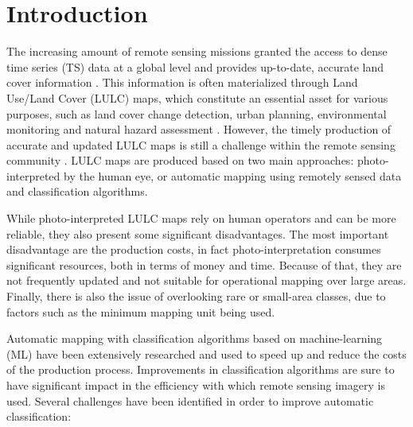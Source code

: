 \documentclass[remotesensing,article,submit,moreauthors,pdftex]{Definitions/mdpi}
\begin{document}
\section{Introduction}

The increasing amount of remote sensing missions granted the access to dense
time series (TS) data at a global level and provides up-to-date, accurate land
cover information \cite{Drusch2012}. This information is often materialized
through Land Use/Land Cover (LULC) maps, which constitute an essential asset for
various purposes, such as land cover change detection, urban planning,
environmental monitoring and natural hazard assessment \cite{Khatami2016}.
However, the timely production of accurate and updated LULC maps is still a
challenge within the remote sensing community \cite{Wulder2018}. LULC maps are
produced based on two main approaches: photo-interpreted by the human eye, or
automatic mapping using remotely sensed data and classification algorithms.

While photo-interpreted LULC maps rely on human operators and can be more
reliable, they also present some significant disadvantages. The most important
disadvantage are the production costs, in fact photo-interpretation consumes
significant resources, both in terms of money and time. Because of that, they are not
frequently updated and not suitable for operational mapping over large areas.
Finally, there is also the issue of overlooking rare or small-area classes, due
to factors such as the minimum mapping unit being used.

Automatic mapping with classification algorithms based on machine-learning (ML)
have been extensively researched and used to speed up and reduce the costs of
the production process. Improvements in classification algorithms are sure to
have significant impact in the efficiency with which remote sensing imagery is
used. Several challenges have been identified in order to improve automatic
classification:
\end{document}
